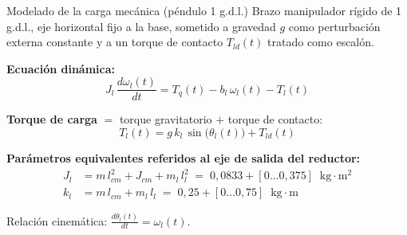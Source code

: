 \documentclass[aspectratio=169,t]{beamer}
\begin{document}
\begin{frame}{Modelado de la carga mecánica (péndulo 1 g.d.l.)}
{\small\color{uncGray}Brazo manipulador rígido de 1 g.d.l., eje horizontal fijo a la base, sometido a gravedad $g$ como perturbación externa constante y a un torque de contacto $T_{ld}(t)$ tratado como escalón.}\par
\vspace{3mm}

\textbf{Ecuación dinámica:}
\begin{equation*}
J_l\,\frac{d\omega_l(t)}{dt} = T_q(t) - b_l\,\omega_l(t) - T_l(t)
\end{equation*}

\textbf{Torque de carga} $=$ torque gravitatorio $+$ torque de contacto:
\begin{equation*}
T_l(t) = g\,k_l\,\sin\!\big(\theta_l(t)\big) + T_{ld}(t)
\end{equation*}

\textbf{Parámetros equivalentes referidos al eje de salida del reductor:}
\begin{align*}
J_l &= m\,l_{cm}^2 + J_{cm} + m_l\,l_l^2 \;=\; 0{,}0833 + [0\dots 0{,}375]\;\;\text{kg}\cdot\text{m}^2 \\
k_l &= m\,l_{cm} + m_l\,l_l \;=\; 0{,}25 + [0\dots 0{,}75]\;\;\text{kg}\cdot\text{m}
\end{align*}

\vspace{1mm}
{\small Relación cinemática: $\frac{d\theta_l(t)}{dt}=\omega_l(t)$.}
\end{frame}
\end{document}

